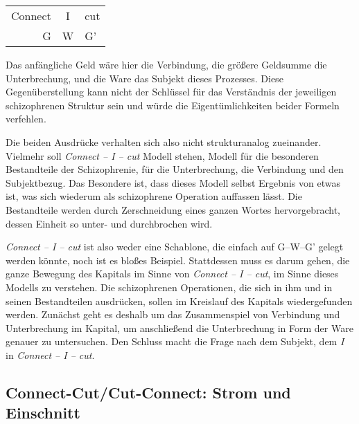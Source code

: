 \documentclass[12pt,
               paper=a4,
               twoside=false,
               onehalfspacing,
               bibliography=totoc,
               toc=graduated,
               ]{scrartcl}
\newcommand{\worries}[1]{\ifdraft{\textcolor{blue}{\texttt{(#1)}}}{}}
\newcommand{\gwg}{G--W--G'\xspace}
\newcommand{\cic}{Connect -- I -- cut\xspace}
\begin{document}
{\centering\hfill
\begin{tabular}{r@{ -- }c@{ -- }l}
Connect & I & cut\\
G & W & G'
\end{tabular}
\hfill}

Das anfängliche Geld wäre hier die Verbindung, die größere Geldsumme
die Unterbrechung, und die Ware das Subjekt dieses Prozesses. Diese
Gegenüberstellung kann nicht der Schlüssel für das Verständnis der
jeweiligen schizophrenen Struktur sein und würde die
Eigentümlichkeiten beider Formeln verfehlen.

Die beiden Ausdrücke verhalten sich also nicht strukturanalog
zueinander. Vielmehr soll \emph{\cic} Modell stehen, Modell für die
besonderen Bestandteile der Schizophrenie, für die Unterbrechung, die
Verbindung und den Subjektbezug. Das Besondere ist, dass dieses Modell
selbst Ergebnis von etwas ist, was sich wiederum als schizophrene
Operation auffassen lässt. Die Bestandteile werden durch Zerschneidung
eines ganzen Wortes hervorgebracht, dessen Einheit so unter- und
durchbrochen wird.

\emph{\cic} ist also weder eine Schablone, die einfach auf \gwg gelegt
werden könnte, noch ist es bloßes Beispiel. Stattdessen muss es darum
gehen, die ganze Bewegung des Kapitals im Sinne von \emph{\cic}, im
Sinne dieses Modells zu verstehen. Die schizophrenen Operationen, die
sich in ihm und in seinen Bestandteilen ausdrücken, sollen im
Kreislauf des Kapitals wiedergefunden werden. Zunächst geht es deshalb
um das Zusammenspiel von Verbindung und Unterbrechung im Kapital, um
anschließend die Unterbrechung in Form der Ware genauer zu
untersuchen. Den Schluss macht die Frage nach dem Subjekt, dem
\emph{I} in \emph{\cic}.



\subsection{Connect-Cut/Cut-Connect: Strom und Einschnitt}

\end{document}
